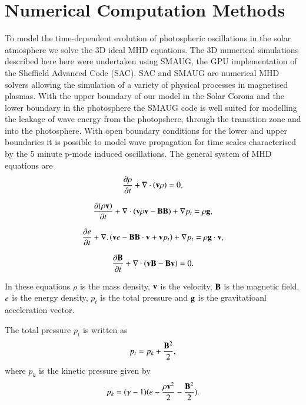 \documentclass{aa}
\begin{document}
\section{Numerical Computation Methods}
To model the time-dependent evolution of photospheric oscillations in the solar atmosphere  we solve the 3D ideal MHD equations.   The 3D numerical simulations described here here were undertaken using SMAUG, the GPU implementation of the Sheffield Advanced Code (SAC)\cite{Griffiths2015}\cite{Shelyag2008}. SAC and SMAUG are numerical MHD solvers allowing the simulation of a variety of physical processes in magnetised plasmas.  With the upper boundary of our model in the Solar Corona and the lower boundary in the photosphere the SMAUG code is well suited for modelling the leakage of wave energy from the photopshere, through the transition zone and into the photosphere. With open boundary conditions for the lower and upper boundaries it is possible to model wave propagation for time scales characterised by the 5 minute p-mode induced oscillations. The general system of MHD equations are
\begin{equation}\label{eqdens}
{{\partial \rho}\over{\partial t}}+\nabla\cdot\left( {\bf v}\rho\right)=0,
\end{equation}

\begin{equation}\label{eqmom}
{{\partial ( \rho {\bf v})}\over{\partial t}}+\nabla\cdot\left( {\bf v}\rho {\bf v}-{\bf B B}\right)+\nabla p_t=\rho{\bf g},
\end{equation}

\begin{equation}\label{eqe}
{{\partial e}\over{\partial t}}+\nabla.\left({\bf v}e-{\bf B B}\cdot{\bf v}+{\bf v}p_{t}\right)+\nabla p_t=\rho{\bf g}\cdot{\bf v},
\end{equation}

\begin{equation}\label{eqb}
{{\partial{\bf B}}\over{\partial t}} +\nabla \cdot\left(  {\bf vB}-{\bf Bv}\right)=0.
\end{equation}

In these equations $\rho$ is the mass density, $  \bf { v} $ is the velocity,   $ \bf B$ is the magnetic field, $\it{e}$ is the energy density, $p_{t}$ is the total pressure and $\bf g$ is the gravitatioanl acceleration vector.

The total pressure $p_{t}$ is written as
\begin{equation}\label{eqpt}
p_{t}=p_{k}+{{\bf B}^{2}\over{2}},
\end{equation}
where $p_k$ is the kinetic pressure given by
\begin{equation}\label{eqpk}
p_{k}=(\gamma - 1)( e-{{\rho \bf v }^{2}\over{2}}-  {{\bf B}^{2}\over{2}} ).
\end{equation}
\end{document}
